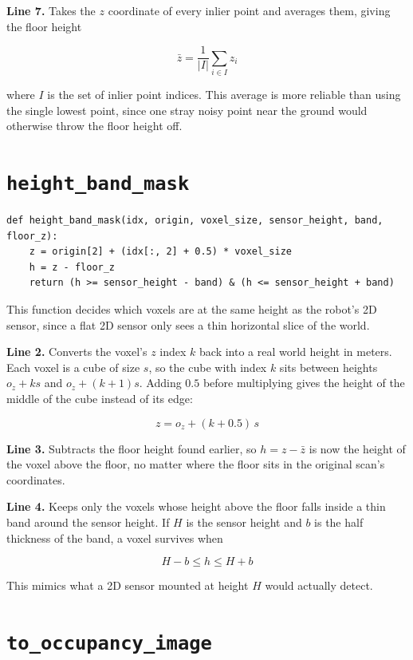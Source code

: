 \documentclass[11pt]{article}
\begin{document}
\textbf{Line 7.} Takes the $z$ coordinate of every inlier point and averages them, giving the floor height

\[
\bar z = \frac{1}{|I|} \sum_{i \in I} z_i
\]

where $I$ is the set of inlier point indices. This average is more reliable than using the single lowest point, since one stray noisy point near the ground would otherwise throw the floor height off.

\section{\texttt{height\_band\_mask}}

\begin{lstlisting}
def height_band_mask(idx, origin, voxel_size, sensor_height, band, floor_z):
    z = origin[2] + (idx[:, 2] + 0.5) * voxel_size
    h = z - floor_z
    return (h >= sensor_height - band) & (h <= sensor_height + band)
\end{lstlisting}

This function decides which voxels are at the same height as the robot's 2D sensor, since a flat 2D sensor only sees a thin horizontal slice of the world.

\textbf{Line 2.} Converts the voxel's $z$ index $k$ back into a real world height in meters. Each voxel is a cube of size $s$, so the cube with index $k$ sits between heights $o_z + k s$ and $o_z + (k+1)s$. Adding $0.5$ before multiplying gives the height of the middle of the cube instead of its edge:

\[
z = o_z + (k + 0.5) \, s
\]

\textbf{Line 3.} Subtracts the floor height found earlier, so $h = z - \bar z$ is now the height of the voxel above the floor, no matter where the floor sits in the original scan's coordinates.

\textbf{Line 4.} Keeps only the voxels whose height above the floor falls inside a thin band around the sensor height. If $H$ is the sensor height and $b$ is the half thickness of the band, a voxel survives when

\[
H - b \le h \le H + b
\]

This mimics what a 2D sensor mounted at height $H$ would actually detect.

\section{\texttt{to\_occupancy\_image}}
\end{document}
